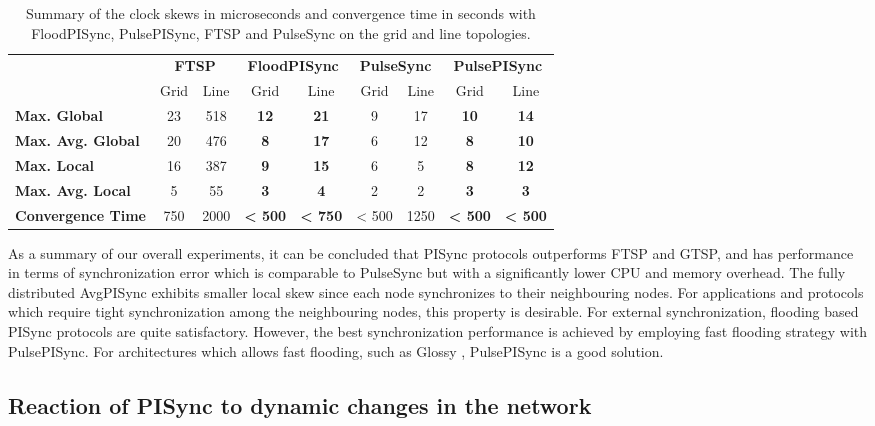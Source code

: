 \documentclass[english,a4paper,10pt,final]{article}
\numberwithin{equation}{section}
\numberwithin{figure}{section}
\begin{document}
\begin{table}

\center

\caption{Summary of the clock skews in microseconds and convergence time in seconds with FloodPISync, PulsePISync, FTSP and PulseSync on the grid and line topologies. \label{table:ftsp-pulsesync-pi}}

\begin{tabular}{lcccc||cccc}
\multicolumn{1}{l}{} & \multicolumn{2}{c}{\textbf{FTSP}} & \multicolumn{2}{c}{\textbf{FloodPISync}} & \multicolumn{2}{c}{\textbf{PulseSync}} & \multicolumn{2}{c}{\textbf{PulsePISync}} \tabularnewline
\multicolumn{1}{l}{}      & Grid & Line & Grid & Line & Grid & Line & Grid & Line \\
\textbf{Max. Global}       &  23  &  518  &  \bf 12  & \bf 21  & { 9} & { 17} & { \bf 10} & { \bf 14} \\ 
\textbf{Max. Avg. Global } &  20   & 476  & \bf 8   & \bf 17  & { 6} & { 12} & { \bf 8} & { \bf 10} \\ 
\textbf{Max. Local }       &  16   & 387  & \bf 9  & \bf 15   & { 6} & { 5}  & { \bf 8} & { \bf 12} \\ 
\textbf{Max. Avg. Local }  &  5   & 55   &  \bf 3   & \bf 4   & { 2}  & { 2}  & { \bf  3} & { \bf 3} \\ 
\textbf{Convergence Time}  &  750  &   2000 & { \bf < 500} & { \bf < 750} & { < 500}  & {  1250}  & { \bf < 500} & { \bf < 500} \\ 
\end{tabular}
\end{table}

As a summary of our overall experiments, it can be concluded that PISync protocols outperforms FTSP and GTSP, and has performance in terms of synchronization error which is comparable to PulseSync but with a significantly lower CPU and memory overhead. The fully distributed AvgPISync exhibits smaller local skew since each node synchronizes to their neighbouring nodes. For applications and protocols which require tight synchronization among the neighbouring nodes, this property is desirable. For external synchronization, flooding based PISync protocols are quite satisfactory. However, the best synchronization performance is achieved by employing fast flooding strategy with PulsePISync. For architectures which allows fast flooding, such as Glossy \cite{ferrari2011efficient}, PulsePISync is a good solution. 

\subsection{Reaction of PISync to dynamic changes in the network}
\end{document}
